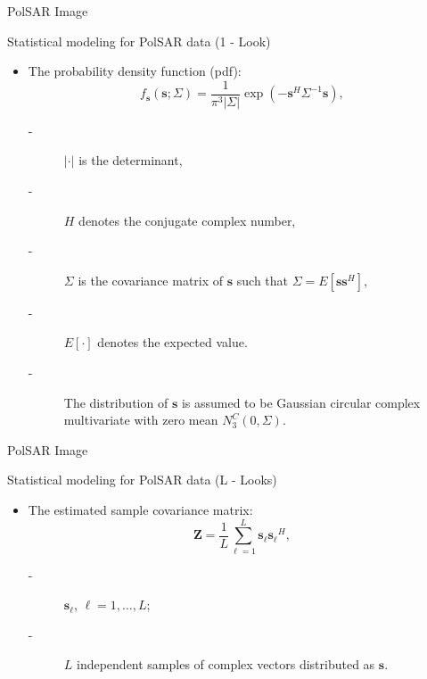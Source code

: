 \documentclass[10pt]{beamer}
\begin{document}
\begin{frame}[fragile]{PolSAR Image}
\begin{alertblock}{Statistical modeling for PolSAR data (1 - Look)}
\begin{itemize}
\item The probability density function (pdf):
\begin{equation}
    f_{\mathbf{s}}(\mathbf{s};\Sigma)=\frac{1}{\pi^3|\Sigma|} \exp(-\mathbf{s}^H\Sigma^{-1}\mathbf{s}),
    \label{eq_02}
\end{equation}
        \begin{description}
        \item[-] $|\cdot|$ is the determinant, 
        \item[-] $H$ denotes the conjugate complex number, 
        \item[-] $\Sigma$ is the covariance matrix of $\mathbf{s}$ such that $\Sigma=E[\mathbf{ss}^H]$,
        \item[-] $E[\cdot]$ denotes the expected value. 
        \item[-] The distribution of $\mathbf{s}$ is assumed to be  Gaussian circular complex multivariate with zero mean $N^{C}_3(0,\Sigma)$.
        \end{description}
\end{itemize}
\end{alertblock}
\end{frame}
%
\begin{frame}[fragile]{PolSAR Image}
\begin{alertblock}{Statistical modeling for PolSAR data (L - Looks)}
\begin{itemize}
\item The estimated sample covariance matrix:
\begin{equation}
    \mathbf{Z}=\frac{1}{L}\sum_{\ell=1}^{L} {\mathbf{s}_\ell}{\mathbf{s}_\ell}^H,
    \label{eq_03}
\end{equation}
\begin{description}
      \item[-] $\mathbf{s}_\ell$, $\ell = 1, \dots, L$;
      \item[-] $L$ independent samples of complex vectors distributed as $\mathbf{s}$. 
\end{description}
\end{itemize}
\end{alertblock}
\end{frame}
\end{document}
